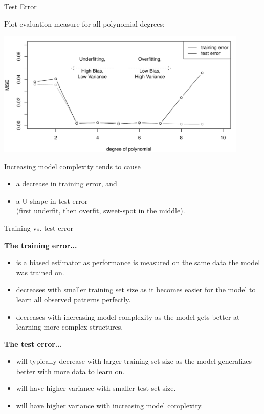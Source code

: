 \documentclass[11pt,compress,t,notes=noshow, xcolor=table]{beamer}
\begin{document}

\begin{vbframe}{Test Error}

Plot evaluation measure for all polynomial degrees:

\includegraphics[width=0.9\textwidth]{figure/eval_test_3} 

Increasing model complexity tends to cause

\begin{itemize}
  \item a decrease in training error, and\\
  \item a U-shape in test error\\ 
  (first underfit, then overfit, sweet-spot in the middle).
  \end{itemize}
  
\end{vbframe}


\begin{vbframe}{Training vs. test error}

\textbf{The training error...}

\begin{itemize}
  \item is a biased estimator as performance is measured on the same data the 
  model was trained on.
  \item decreases with smaller training set size as it becomes easier for the 
  model to learn all observed patterns perfectly.
  \item decreases with increasing model complexity as the model gets better at
  learning more complex structures.
\end{itemize}

\vfill

\textbf{The test error...}

\begin{itemize}
  \item will typically decrease with larger training set size as the model 
  generalizes better with more data to learn on.
  \item will have higher variance with smaller test set size.
  \item will have higher variance with increasing model complexity.
\end{itemize}

\end{vbframe}
\end{document}

